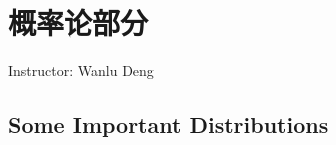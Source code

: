 \chapter{概率论部分}\label{Section1Probability}
\begin{center}
    Instructor: Wanlu Deng
\end{center}


    












\section{Some Important Distributions}\label{SectionImportantDistributions}

